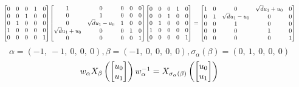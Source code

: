 \documentclass[11pt]{article}
\theoremstyle{definition}
\begin{document}
\[
\scaletoalign{\textwidth}{{\left[\begin{matrix}0 & 0 & 0 & 1 & 0\\0 & 0 & 1 & 0 & 0\\0 & 1 & 0 & 0 & 0\\1 & 0 & 0 & 0 & 0\\0 & 0 & 0 & 0 & 1\end{matrix}\right]} {\left[\begin{matrix}1 & 0 & 0 & 0 & 0\\0 & 1 & 0 & 0 & 0\\0 & \sqrt{d} u_{1} - u_{0} & 1 & 0 & 0\\\sqrt{d} u_{1} + u_{0} & 0 & 0 & 1 & 0\\0 & 0 & 0 & 0 & 1\end{matrix}\right]} {\left[\begin{matrix}0 & 0 & 0 & 1 & 0\\0 & 0 & 1 & 0 & 0\\0 & 1 & 0 & 0 & 0\\1 & 0 & 0 & 0 & 0\\0 & 0 & 0 & 0 & 1\end{matrix}\right]} = {\left[\begin{matrix}1 & 0 & 0 & \sqrt{d} u_{1} + u_{0} & 0\\0 & 1 & \sqrt{d} u_{1} - u_{0} & 0 & 0\\0 & 0 & 1 & 0 & 0\\0 & 0 & 0 & 1 & 0\\0 & 0 & 0 & 0 & 1\end{matrix}\right]}}
\]
\[
\alpha = \left( -1, \  -1, \  0, \  0, \  0\right), \beta = \left( -1, \  0, \  0, \  0, \  0\right), \sigma_{\alpha}(\beta) = \left( 0, \  1, \  0, \  0, \  0\right)
\]
\[
\scaletoalign{\textwidth}{w_{\alpha} X_{\beta}\left(\left[\begin{matrix}u_{0}\\u_{1}\end{matrix}\right]\right) w_{\alpha}^{-1} = X_{\sigma_{\alpha}\left(\beta\right)}\left(\left[\begin{matrix}u_{0}\\u_{1}\end{matrix}\right]\right)}
\]
\end{document}
